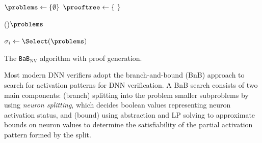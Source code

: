 \documentclass[oneside,11pt,dvipsnames]{book}
\newcommand{\dd}{\texttt{BaB$_{\text{NV}}$}}
\begin{document}
\begin{algorithm}[t]
    \footnotesize
    \DontPrintSemicolon
  
    \BlankLine


    $\problems \leftarrow \{ \emptyset \}$  
    $\prooftree \gets \{ ~ \}$ \label{line:prooftree}
    
    \While(){$\problems$}{\label{line:dpllstart}
        $\sigma_i \gets \Select(\problems)$ 
        
    }\label{line:dpllend}
    \Return{\unsat}
    
    \caption{The \dd{} algorithm with proof generation.}\label{fig:alg}
\end{algorithm}

Most modern DNN verifiers adopt the branch-and-bound (BnB) approach to search for activation patterns for DNN verification. A BnB search consists of two main components: (branch) splitting into the problem smaller subproblems 
by using \emph{neuron splitting}, which decides boolean values representing neuron activation status, 
and (bound) using abstraction and LP solving to approximate bounds on neuron values to determine 
the satisfiability of the partial activation pattern formed by the split.
\end{document}
